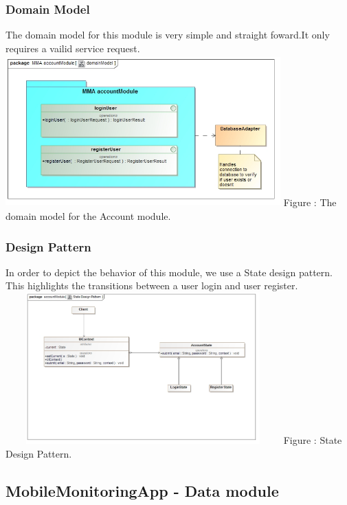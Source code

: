 \documentclass[hidelinks, 12pt, oneside]{article}
\begin{document}
		\subsubsection{Domain Model}
		
		The domain model for this module is very simple and straight foward.It only requires a vailid service request.\newline
		\includegraphics[width=400px,height=220px]{img/DomainModelAccountModule.jpg}
		Figure : The domain model for the Account module.
		
		\subsubsection{Design Pattern}
		In order to depict the behavior of this module, we use a State design pattern. This highlights the transitions 
		between a user login and user register.\newline
		\includegraphics[width=400px,height=220px]{img/design_patterns/AccountModule_StateDesignPattern.jpg}
		Figure : State Design Pattern.
	\subsection{MobileMonitoringApp - Data module}
\end{document}
